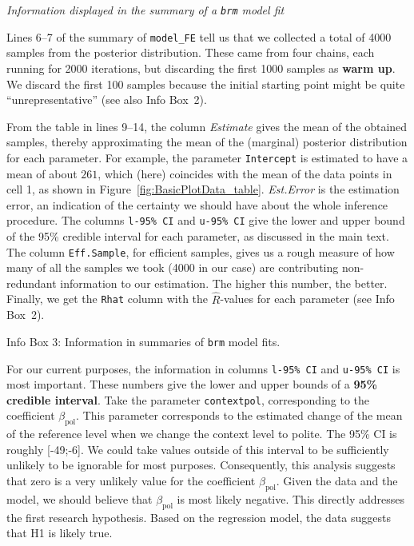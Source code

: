 \documentclass[nobib]{tufte-handout}
\begin{document}
\begin{InfoBox}[t]
\centering
\colorbox{mygray}{\centering
  \begin{minipage}{1.0\textwidth}

    \emph{Information displayed in the summary of a \texttt{brm} model fit}
    \medskip

    Lines 6--7 of the summary of \texttt{model\_FE} tell us that we collected a total of 4000 samples from the posterior distribution. These came from four chains, each running for 2000 iterations, but discarding the first 1000 samples as \textbf{warm up}. We discard the first 100 samples because the initial starting point might be quite ``unrepresentative'' (see also Info Box~2).
    
    From the table in lines 9--14, the column \emph{Estimate} gives the mean of the obtained
    samples, thereby approximating the mean of the (marginal) posterior distribution for each
    parameter. For example, the parameter \texttt{Intercept} is estimated to have a mean of
    about $261$, which (here) coincides with the mean of the data points in cell 1, as shown in
    Figure~\ref{fig:BasicPlotData_table}. \emph{Est.Error} is the estimation error, an
    indication of the certainty we should have about the whole inference procedure. The columns
    \texttt{l-95\% CI} and \texttt{u-95\% CI} give the lower and upper bound of the 95\%
    credible interval for each parameter, as discussed in the main text. The column
    \texttt{Eff.Sample}, for efficient samples, gives us a rough measure of how many of all the
    samples we took (4000 in our case) are contributing non-redundant information to our
    estimation. The higher this number, the better. Finally, we get the \texttt{Rhat} column
    with the $\hat{R}$-values for each parameter (see Info Box~2).
    
  \end{minipage} \par
  } \par
  \begin{center}
    Info Box 3: Information in summaries of \texttt{brm} model fits.
  \end{center}
\end{InfoBox}


For our current purposes, the information in  columns \texttt{l-95\% CI} and \texttt{u-95\% CI} is most important.
These numbers give the lower and upper bounds of a \textbf{95\% credible interval}.
Take the parameter \texttt{contextpol}, corresponding to the coefficient $\beta_{\text{pol}}$.
This parameter corresponds to the estimated change of the mean of the reference level when we change the context level to polite.
The 95\% CI is roughly [-49;-6].
We could take values outside of this interval to be sufficiently unlikely to be ignorable for most purposes.
Consequently, this analysis suggests that zero is a very unlikely value for the coefficient
$\beta_{\text{pol}}$.
Given the data and the model, we should believe that $\beta_{\text{pol}}$ is most likely negative.
This directly addresses the first research hypothesis. Based on the regression model, the data suggests that H1 is likely true.
\end{document}
